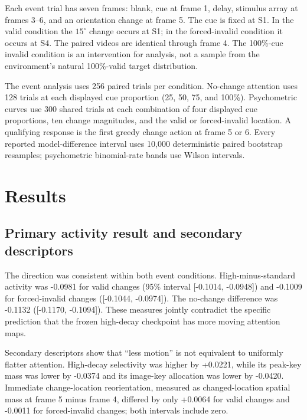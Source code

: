 \documentclass[11pt]{article}
\begin{document}
Each event trial has seven frames: blank, cue at frame 1, delay, stimulus array at frames 3--6, and an orientation change at frame 5. The cue is fixed at S1. In the valid condition the $15^\circ$ change occurs at S1; in the forced-invalid condition it occurs at S4. The paired videos are identical through frame 4. The 100\%-cue invalid condition is an intervention for analysis, not a sample from the environment's natural 100\%-valid target distribution.

The event analysis uses 256 paired trials per condition. No-change attention uses 128 trials at each displayed cue proportion (25, 50, 75, and 100\%). Psychometric curves use 300 shared trials at each combination of four displayed cue proportions, ten change magnitudes, and the valid or forced-invalid location. A qualifying response is the first greedy change action at frame 5 or 6. Every reported model-difference interval uses 10,000 deterministic paired bootstrap resamples; psychometric binomial-rate bands use Wilson intervals.

\section{Results}
\subsection{Primary activity result and secondary descriptors}
The direction was consistent within both event conditions. High-minus-standard activity was -0.0981 for valid changes (95\% interval [-0.1014, -0.0948]) and -0.1009 for forced-invalid changes ([-0.1044, -0.0974]). The no-change difference was -0.1132 ([-0.1170, -0.1094]). These measures jointly contradict the specific prediction that the frozen high-decay checkpoint has more moving attention maps.

Secondary descriptors show that ``less motion'' is not equivalent to uniformly flatter attention. High-decay selectivity was higher by +0.0221, while its peak-key mass was lower by -0.0374 and its image-key allocation was lower by -0.0420. Immediate change-location reorientation, measured as changed-location spatial mass at frame 5 minus frame 4, differed by only +0.0064 for valid changes and -0.0011 for forced-invalid changes; both intervals include zero.
\end{document}
